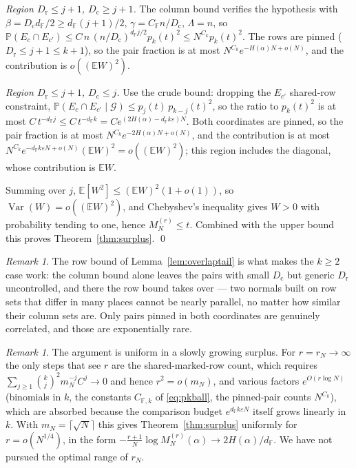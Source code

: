 \documentclass[11pt,reqno]{amsart}
\theoremstyle{plain}
\theoremstyle{definition}
\theoremstyle{remark}
\newtheorem{remark}[theorem]{Remark}
\newcommand{\F}{\mathbb{F}}
\newcommand{\PP}{\mathbb{P}}
\newcommand{\EE}{\mathbb{E}}
\newcommand{\dF}{d_{\F}}
\DeclareMathOperator{\Var}{Var}
\begin{document}
\emph{Region $D_{\mathrm r}\le j+1$, $D_{\mathrm c}\ge j+1$.} The column bound verifies the
hypothesis with $\beta=D_{\mathrm c}\dF/2\ge\dF(j+1)/2$, $\gamma=C_\F n/D_{\mathrm c}$,
$\Lambda=n$, so $\PP(E_c\cap E_{c'})\le C\,n\,(n/D_{\mathrm c})^{\dF j/2}p_k(t)^2\le
N^{C_k}p_k(t)^2$. The rows are pinned ($D_{\mathrm r}\le j+1\le k+1$), so the pair fraction is at
most $N^{C_k}e^{-H(\alpha)N+o(N)}$, and the contribution is $o((\EE W)^2)$.

\emph{Region $D_{\mathrm r}\le j+1$, $D_{\mathrm c}\le j$.} Use the crude bound: dropping the
$E_{c'}$ shared-row constraint, $\PP(E_c\cap E_{c'}\mid\mathcal G)\le p_j(t)\,p_{k-j}(t)^2$, so the
ratio to $p_k(t)^2$ is at most $C\,t^{-\dF j}\le C\,t^{-\dF k}=Ce^{(2H(\alpha)-\dF
k\varepsilon)N}$. Both coordinates are pinned, so the pair fraction is at most
$N^{C_k}e^{-2H(\alpha)N+o(N)}$, and the contribution is at most $N^{C_k}e^{-\dF k\varepsilon
N+o(N)}(\EE W)^2=o((\EE W)^2)$; this region includes the diagonal, whose contribution is $\EE W$.

Summing over $j$, $\EE[W^2]\le(\EE W)^2(1+o(1))$, so $\Var(W)=o((\EE W)^2)$, and Chebyshev's
inequality gives $W>0$ with probability tending to one, hence $M_N^{(r)}\le t$. Combined with the
upper bound this proves Theorem~\ref{thm:surplus}. \qed

\begin{remark}
The row bound of Lemma~\ref{lem:overlaptail} is what makes the $k\ge2$ case work: the column bound
alone leaves the pairs with small $D_{\mathrm c}$ but generic $D_{\mathrm r}$ uncontrolled, and
there the row bound takes over --- two normals built on row sets that differ in many places cannot
be nearly parallel, no matter how similar their column sets are. Only pairs pinned in both
coordinates are genuinely correlated, and those are exponentially rare.
\end{remark}

\begin{remark}\label{rem:moderate}
The argument is uniform in a slowly growing surplus. For $r=r_N\to\infty$ the only steps that see
$r$ are the shared-marked-row count, which requires $\sum_{j\ge1}\binom kj^2m_N^{-j}C^j\to0$ and
hence $r^2=o(m_N)$, and various factors $e^{O(r\log N)}$ (binomials in $k$, the constants
$C_{\F,k}$ of \eqref{eq:pkball}, the pinned-pair counts $N^{C_k}$), which are absorbed because the
comparison budget $e^{\dF k\varepsilon N}$ itself grows linearly in $k$. With $m_N=\lceil\sqrt
N\rceil$ this gives Theorem~\ref{thm:surplus} uniformly for $r=o(N^{1/4})$, in the form
$-\tfrac{r+1}N\log M_N^{(r)}(\alpha)\to2H(\alpha)/\dF$. We have not pursued the optimal range of
$r_N$.
\end{remark}
\end{document}
